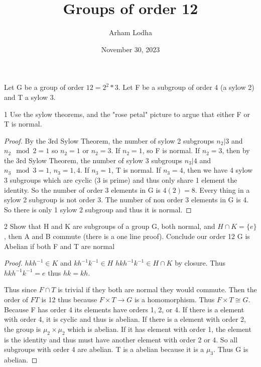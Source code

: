 \documentclass{article}
\begin{document}
\title{Groups of order 12}
\author{Arham Lodha}%
\date{November 30, 2023}%
\maketitle

Let G be a group of order $12 = 2^2 * 3$. 
Let F be a subgroup of order 4 (a sylow 2) and T a sylow 3. 

\begin{PROB}{1}\label{Problem 1.}
    Use the sylow theorems, and the "rose petal" picture to argue that either F or T is normal.
\end{PROB}
\begin{proof}
    By the 3rd Sylow Theorem, the number of sylow 2 subgroups $n_2 | 3$ and $n_2 \mod 2 = 1$ so $n_2 = 1$ or $n_2 = 3$. If $n_2 = 1$, so F is normal. If $n_2 = 3$, then by the 3rd Sylow Theorem, the number of sylow 3 subgroups $n_3 | 4$ and $n_3 \mod 3 = 1$, $n_3 = 1, 4$. If $n_3 = 1$, T is normal. If $n_3 = 4$, then we have 4 sylow 3 subgroups which are cyclic (3 is prime) and thus only share 1 element the identity. So the number of order 3 elements in G is $4(2) = 8$. Every thing in a sylow 2 subgroup is not order 3. The number of non order 3 elements in G is 4. So there is only 1 sylow 2 subgroup and thus it is normal.
\end{proof}

\bigskip

\begin{PROB}{2}\label{Problem 2.}
    Show that H and K are subgroups of a group G, both normal, and $H \cap K = \{e\}$, then A and B commute (there is a one line proof). Conclude our order 12 G is Abelian if both F and T are normal
\end{PROB}
\begin{proof}
    $hkh^{-1} \in K$ and $kh^{-1}k^{-1} \in H$ $hkh^{-1}k^{-1} \in H \cap K$ by closure. Thus $hkh^{-1}k^{-1} = e$ thus $hk = kh$. 
    
    Thus since $F \cap T$ is trivial if they both are normal they would commute. Then the order of $FT$ is 12 thus because $F \times T \to G$ is a homomorphism. Thus $F \times T \cong G$. Because F has order 4 its elements have orders 1, 2, or 4. If there is a element with order 4, it is cyclic and thus is abelian. If there is a element with order 2, the group is $\mu_2 \times \mu_2$ which is abelian. If it has element with order 1, the element is the identity and thus must have another element with order 2 or 4. So all subgroups with order 4 are abelian. T is a abelian because it is a $\mu_3$. Thus G is abelian. 
\end{proof}
\end{document}
